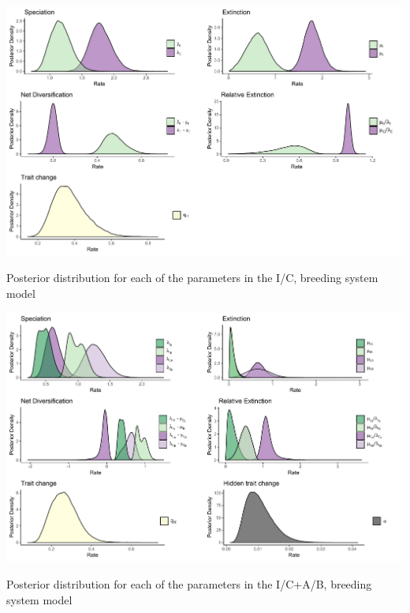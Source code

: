 \begin{suppfigure}
\includegraphics[width=\textwidth]{bisseSIposteriordist.pdf}
\caption{Posterior distribution for each of the parameters in the I/C, breeding system model} %
\label{suppfigure:IC}
\end{suppfigure}

\begin{suppfigure}
\includegraphics[width=\textwidth]{hisseSInoretposteriordist.pdf}
\caption{Posterior distribution for each of the parameters in the I/C+A/B, breeding system model} %
\label{suppfigure:ICAB}
\end{suppfigure}

